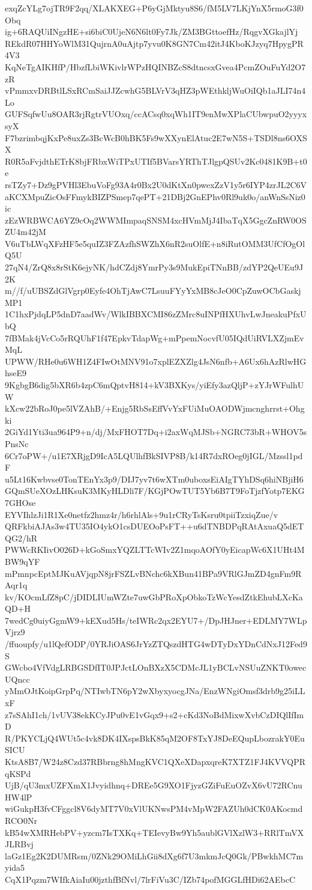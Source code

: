 exqZcYLg7ojTR9F2qq/XLAKXEG+P6yGjMktyu8S6/fM5LV7LKjYnX5rmoG3f0Obq
ig+6RAQUiINgzHE+si6biC0UjeN6N6lt0Fy7Jk/ZM3BGttoefHz/RqgvXGkajlYj
REkdR07HHYoWlM31QujrnA0uAjtp7yvu0K8GN7Cm42itJ4KboKJzyq7HpygPR4V3
KqNeTgAIKHfP/HbzfLbiWKivlrWPzHQINBZcS8dtncsxGvea4PcmZOuFuYd2O7zR
vPmmxvDRBtlLSxRCmSaiJJZcwhG5BLVrV3qHZ3pWEthkljWuOiIQb1aJLI74n4Lo
GUFSqfwUu8OAR3rjRgtrVUOxq/ccACsq0xqWh1IT9enMwXPlaCUbwpuO2yyyxsyX
F7bzrimbqjKxPe8uxZs3BcWcB0hBK5Fs9wXXynElAtuc2E7wN5S+TSDl8ns6OXSX
R0R5aFvjdthETrK8bjFRbxWiTPxUTIf5BVarsYRThTJlgpQSUv2Kc0481K9B+t0e
rsTZy7+Dz9gPVHl3EbuVoFg93A4r0Bx2U0dKtXn0pwexZzV1y5r6IYP4zrJL2C6V
aKCXMpuZicOsFFmykBIZPSmep7qePT+21DBj2GnEPhv0Rl9uk0o/anWnSsNiz0ic
zEzWRBWCA6YZ9cOq2WWMImpaqSNSM4xcHVmMjJ4IbaTqX5GgcZnRW0OSZU4m42jM
V6uTbLWqXFzHF5e5quIZ3FZAzfhSWZhX6nR2suOlfE+n8iRutOMM3UfCfOgOlQ5U
27qN4/ZrQ8x8rStK6ejyNK/hdCZdj8YmrPy3s9MukEpiTNnBB/zdYP2QeUEu9J2K
m//f/uUBSZdGlVgrp0Eyfe4OhTjAwC7LsuuFYyYxMB8cJeO0CpZuwOCbGaskjMP1
1C1hxPjdqLP5dnD7aadWv/WlkIBBXCMI86zZMrc8uINPfHXUhvLwJneakuPfxUbQ
7fBMak4jVcCo5rRQUhF1f47EpkvTdapWg+mPpemNocvfU05IQdUiRVLXZjmEvMqL
UPWW/RHe0u6WH1Z4FIwOtMNV91o7xplEZXZlg4JsN6nfb+A6Ux6hAzRlwHGhseE9
9KgbgB6dig5bXR6b4zpC6mQptvH814+kV3BXKys/yiEfy3azQljP+zYJrWFulhUW
kXcw22bRoJ0pe5lVZAhB/+Enjg5RbSsEffVvYxFUiMuOAODWjmcnghrrst+Ohgki
2GiYd1Yti3ua964P9+n/dj/MxFHOT7Dq+i2axWqMJSb+NGRC73bR+WHOV5sPnsNc
6Cr7oPW+/u1E7XRjgD9IcA5LQUlhfBkSIVP8B/k14R7dxROeg0jIGL/Mzssl1pdF
u5Lt16Kwbvse0TonTEnYx3p9/DIJ7yv7t6wXTm0uboxsEiAIgTYhDSq6hiNBjiH6
GQmSUeXOzLHKsuK3MKyHLDli7F/KGjPOwTUT5Yb6B7T9FoTjzfYotp7EKG7GHOse
EYVIhlzJi1R1Xe0netfz2hmz4r/h6rhlAls+9u1rCRyTsKsru0tpiiTzxiqZue/v
QRFkbiAJAs3w4TU35IO4ykO1csDUEOoPsFT++u6dTNBDPqRAtAxuaQ5dETQG2/hR
PWWcRKIivO026D+kGoSmxYQZLTTcWIv2Z1mqoAOfY0yEicapWc6X1UHt4MBW9qYF
mPmnpcEptMJKuAVjqpN8jrFSZLvBNchc6kXBun41BPa9VRlGJmZD4gnFm9RAqr1q
kv/KOcmLfZ8pC/jDIDLIUmWZte7uwGbPRoXpObkoTzWcYesdZtkEhubLXcKaQD+H
7wedCg0uiyGgmW9+kEXud5Hs/teIWRc2qx2EYU7+/DpJHJner+EDLMY7WLpVjrz9
/ffuoupfy/u1lQefODP/0YRJiOAS6JrYzZTQszdHTG4wDTyDxYDnCdNxJ12Fed9S
GWcbo4VfVdgLRBGSDfIT0JPJctLOnBXzX5CDMcJL1yBCLvNSUuZNKT0owecUQncc
yMmOJtKoipGrpPq/NTIwbTN6pY2wXbyxyocgJNa/EnzWNgiOmsf3drb9g25iLLxF
z7sSAhI1ch/1vUV38ekKCyJPu0vE1vGqx9+s2+cKd3NoBdMixwXvbCzDIQlIfImD
R/PKYCLjQ4WUt5c4vk8DK4IXspsBkK85qM2OF8TxYJ8DeEQupLbozrakY0EuSICU
KtsA8B7/W24z8Czd37RBbrng8hMngKVC1QXeXDapxqreK7XTZ1FJ4KVVQPRqKSPd
UjB/qU3mxUZFXmX1Jvyidhnq+DREe5G9XO1FjyzGZiFuEuOZvX6vU72RCnuHW4lP
wiGukpH3fvCFggcl8V6dyMT7V0xVlUKNwsPM4vMpW2FAZUh0dCK0AKocmdRCO0Nr
kB54wXMRHebPV+yzcm7IsTXKq+TEIevyBw9Yh5aublGVlXzlW3+RRlTmVXJLRBvj
laGz1Eg2K2DUMRsm/0ZNk29OMiLhGii8dXg6f7U3mkmJcQ0Gk/PBwkhMC7myida5
CqX1Pqzm7WIfkAiaIu00jzthfBfNvl/7lrFiVu3C/IZb74pofMGGLfHDi62AEbcC
